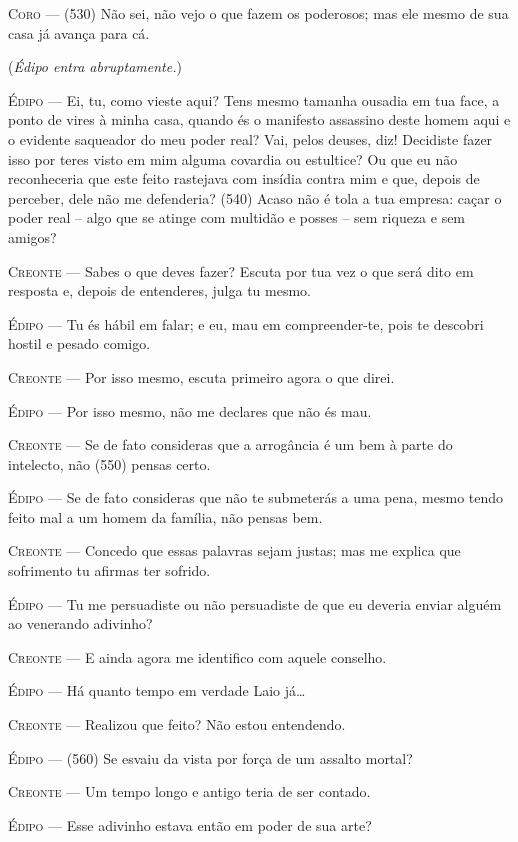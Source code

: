 \textsc{Coro} --- (530) Não sei, não vejo o que fazem os poderosos; mas ele mesmo de sua
casa já avança para cá.

(\emph{Édipo entra abruptamente.})

\textsc{Édipo} --- Ei, tu, como vieste aqui? Tens mesmo tamanha ousadia em tua face, a
ponto de vires à minha casa, quando és o manifesto assassino deste homem
aqui e o evidente saqueador do meu poder real? Vai, pelos deuses, diz!
Decidiste fazer isso por teres visto em mim alguma covardia ou
estultice? Ou que eu não reconheceria que este feito rastejava com
insídia contra mim e que, depois de perceber, dele não me defenderia?
(540) Acaso não é tola a tua empresa: caçar o poder real -- algo que se
atinge com multidão e posses -- sem riqueza e sem amigos?

\textsc{Creonte} --- Sabes o que deves fazer? Escuta por tua vez o que será dito em resposta
e, depois de entenderes, julga tu mesmo.

\textsc{Édipo} --- Tu és hábil em falar; e eu, mau em compreender-te, pois te descobri
hostil e pesado comigo.

\textsc{Creonte} --- Por isso mesmo, escuta primeiro agora o que direi.

\textsc{Édipo} --- Por isso mesmo, não me declares que não és mau.

\textsc{Creonte} --- Se de fato consideras que a arrogância é um bem à parte do intelecto,
não (550) pensas certo.

\textsc{Édipo} --- Se de fato consideras que não te submeterás a uma pena, mesmo tendo
feito mal a um homem da família, não pensas bem.

\textsc{Creonte} --- Concedo que essas palavras sejam justas; mas me explica que sofrimento
tu afirmas ter sofrido.

\textsc{Édipo} --- Tu me persuadiste ou não persuadiste de que eu deveria enviar alguém ao
venerando adivinho?

\textsc{Creonte} --- E ainda agora me identifico com aquele conselho.

\textsc{Édipo} --- Há quanto tempo em verdade Laio já\ldots{}

\textsc{Creonte} --- Realizou que feito? Não estou entendendo.

\textsc{Édipo} --- (560) Se esvaiu da vista por força de um assalto mortal?

\textsc{Creonte} --- Um tempo longo e antigo teria de ser contado.

\textsc{Édipo} --- Esse adivinho estava então em poder de sua arte?

